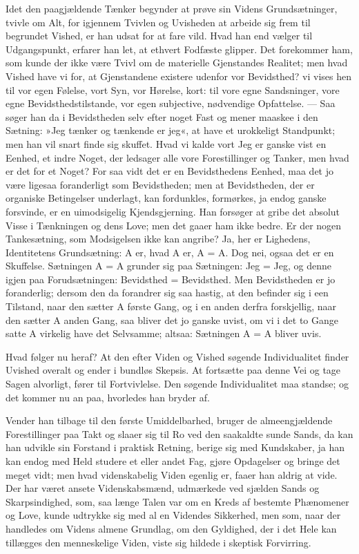 \documentclass[12pt]{book}
\newcommand{\apage}[1]{\marginnote{\footnotesize\textit{[#1]}}}
\begin{document}
Idet den paagjældende Tænker begynder at prøve sin Videns Grundsætninger,
tvivle om Alt, for igjennem Tvivlen og Uvisheden at arbeide sig frem til
begrundet Vished, er han udsat for at fare vild. Hvad han end vælger til
Udgangspunkt, erfarer han let, at ethvert Fodfæste glipper. Det
forekommer ham, som kunde der ikke være Tvivl om de materielle
Gjenstandes Realitet; men hvad Vished have vi for, at Gjenstandene
existere udenfor vor Bevidsthed? vi vises hen til vor egen Følelse, vort
Syn, vor Hørelse, kort: til vore egne Sandsninger, vore egne
Bevidsthedstilstande, vor egen subjective, nødvendige Opfattelse. --- Saa
søger han da i Bevidstheden selv efter noget Fast og mener maaskee i den
Sætning: »Jeg tænker og tænkende er jeg«, at have et urokkeligt
Standpunkt; men han vil snart finde sig skuffet. Hvad vi kalde vort Jeg
er ganske vist en Eenhed, et indre Noget, der ledsager alle vore
Forestillinger og Tanker, men hvad er det for et Noget? For saa vidt det
er en Bevidsthedens Eenhed, maa det jo være ligesaa foranderligt som
Bevidstheden; men at Bevidstheden, der er organiske Betingelser
underlagt, kan fordunkles, formørkes, ja endog ganske forsvinde, er en
uimodsigelig Kjendsgjerning. Han forsøger at gribe det absolut Visse i
Tænkningen og dens Love; men det gaaer ham ikke bedre. Er der nogen
Tankesætning, som Modsigelsen ikke kan angribe? Ja, her er  \apage{5} Lighedens,
Identitetens Grundsætning: A er, hvad A er, A = A. Dog nei, ogsaa det er
en Skuffelse. Sætningen A = A grunder sig paa Sætningen: Jeg = Jeg, og
denne igjen paa Forudsætningen: Bevidsthed = Bevidsthed. Men Bevidstheden
er jo foranderlig; dersom den da forandrer sig saa hastig, at den
befinder sig i een Tilstand, naar den sætter A første Gang, og i en anden
derfra forskjellig, naar den sætter A anden Gang, saa bliver det jo
ganske uvist, om vi i det to Gange satte A virkelig have det Selvsamme;
altsaa: Sætningen A = A bliver uvis.

Hvad følger nu heraf? At den efter Viden og Vished søgende Individualitet
finder Uvished overalt og ender i bundløs Skepsis. At fortsætte paa denne
Vei og tage Sagen alvorligt, fører til Fortvivlelse. Den søgende
Individualitet maa standse; og det kommer nu an paa, hvorledes han bryder
af.

Vender han tilbage til den første Umiddelbarhed, bruger de
almeengjældende Forestillinger paa Takt og slaaer sig til Ro ved den
saakaldte sunde Sands, da kan han udvikle sin Forstand i praktisk
Retning, berige sig med Kundskaber, ja han kan endog med Held studere et
eller andet Fag, gjøre Opdagelser og bringe det meget vidt; men hvad
videnskabelig Viden egenlig er, faaer han aldrig at vide. Der har været
ansete Videnskabsmænd, udmærkede ved sjælden Sands og Skarpsindighed,
som, saa længe Talen var om en Kreds af bestemte Phænomener og Love,
kunde udtrykke sig med al en Videndes Sikkerhed, men som, naar der
handledes om Videns almene Grundlag, om den \apage{6} Gyldighed, der i det Hele kan
tillægges den menneskelige Viden, viste sig hildede i skeptisk
Forvirring.
\end{document}
